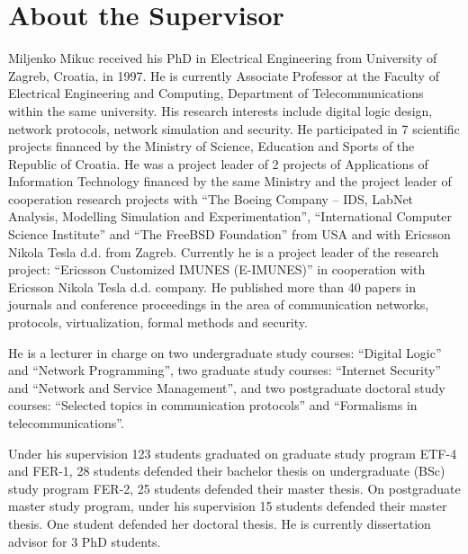 \section*{About the Supervisor}
Miljenko Mikuc received his PhD in Electrical Engineering from University of
Zagreb, Croatia, in 1997. He is currently Associate Professor at the Faculty of
Electrical Engineering and Computing, Department of Telecommunications within
the same university. His research interests include digital logic design,
network protocols, network simulation and security. He participated in 7
scientific projects financed by the Ministry of Science, Education and Sports of
the Republic of Croatia. He was a project leader of 2 projects of Applications
of Information Technology financed by the same Ministry and the project leader
of cooperation research projects with ``The Boeing Company – IDS, LabNet
Analysis, Modelling Simulation and Experimentation'', ``International Computer
Science Institute'' and ``The FreeBSD Foundation'' from USA and with Ericsson
Nikola Tesla d.d. from Zagreb. Currently he is a project leader of the research
project: ``Ericsson Customized IMUNES (E-IMUNES)'' in cooperation with Ericsson
Nikola Tesla d.d. company. He published more than 40 papers in journals and
conference proceedings in the area of communication networks, protocols,
virtualization, formal methods and security.

He is a lecturer in charge on two undergraduate study courses: ``Digital Logic''
and ``Network Programming'', two graduate study courses: ``Internet Security'' and
``Network and Service Management'', and two postgraduate doctoral study
courses: ``Selected topics in communication protocols'' and ``Formalisms in
telecommunications''.

Under his supervision 123 students graduated on graduate study program ETF-4 and
FER-1, 28 students defended their bachelor thesis on undergraduate (BSc) study
program FER-2, 25 students defended their master thesis. On postgraduate master
study program, under his supervision 15 students defended their master thesis.
One student defended her doctoral thesis. He is currently dissertation advisor
for 3 PhD students.
